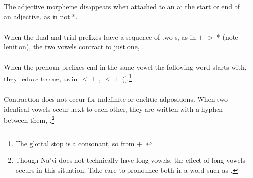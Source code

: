 \subsubsection{} The adjective morpheme  disappears when
attached to an  at the start or end of an adjective, as in
 not *.

\subsubsection{} When the dual and trial prefixes leave a sequence of
two s, as in  $+$  $>$ * (note
lenition), the two vowels contract to just one, .
\label{l-and-s:phonotactics:nsc} 

\subsubsection{} When the prenoun prefixes end in the same vowel the
following word starts with, they reduce to one, as in  $<$
 $+$ ,  $<$  $+$ 
().\footnote{The glottal stop is a
consonant, so  from  $+$ .}
\label{l-and-s:phonotactics:precontract}

\subsubsection{} Contraction does not occur for indefinite  or
enclitic adpositions.  When two identical vowels occur next to each
other, they are written with a hyphen between them, 
  .\footnote{Though Na'vi
does not technically have long vowels, the effect of long vowels
occurs in this situation.  Take care to pronounce both  in a word
such as .}


